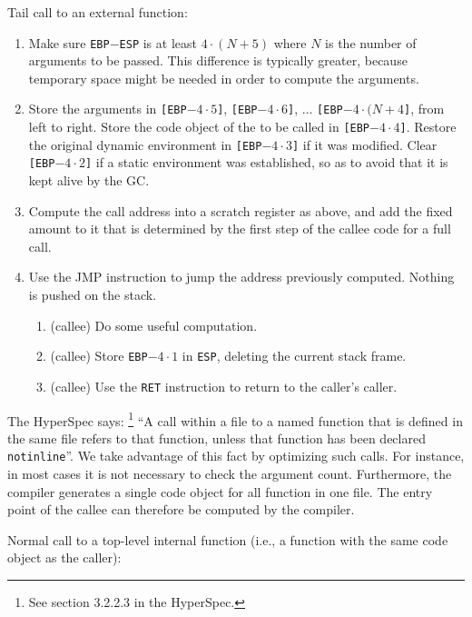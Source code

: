 Tail call to an external function:

\begin{enumerate}
\item Make sure \texttt{EBP}$-$\texttt{ESP} is at least $4 \cdot (N +
  5)$ where $N$ is the number of arguments to be passed.  This
  difference is typically greater, because temporary space might be
  needed in order to compute the arguments.
\item Store the arguments in 
  \texttt{[EBP$- 4 \cdot 5$]}, 
  \texttt{[EBP$- 4 \cdot 6$]}, 
  $\ldots$
  \texttt{[EBP$- 4 \cdot (N + 4$]},
  from left to right.  Store the code object of the to be called in
  \texttt{[EBP$- 4 \cdot 4$]}.  
  Restore the original dynamic environment in 
  \texttt{[EBP$- 4 \cdot 3$]}
  if it was modified.  Clear 
  \texttt{[EBP$- 4 \cdot 2$]} if a static environment was
  established, so as to avoid that it is kept alive by the GC.
\item Compute the call address into a scratch register as above, and
  add the fixed amount to it that is determined by the first step of
  the callee code for a full call.
\item Use the JMP instruction to jump the address previously computed.
  Nothing is pushed on the stack. 
  \begin{enumerate}
  \item (callee) Do some useful computation.
  \item (callee) Store \texttt{EBP$- 4 \cdot 1$} in \texttt{ESP},
    deleting the current stack frame.
  \item (callee) Use the \texttt{RET} instruction to return to the
    caller's caller.
  \end{enumerate}
\end{enumerate}

The HyperSpec says:%
\footnote{See section 3.2.2.3 in the HyperSpec.}
``A call within a file to a named function that is defined in the same
file refers to that function, unless that function has been declared
\texttt{notinline}''.  We take advantage of this fact by optimizing
such calls.  For instance, in most cases it is not necessary to check
the argument count.  Furthermore, the compiler generates a single code
object for all function in one file.  The entry point of the callee
can therefore be computed by the compiler. 

Normal call to a top-level internal function (i.e., a function with
the same code object as the caller):

